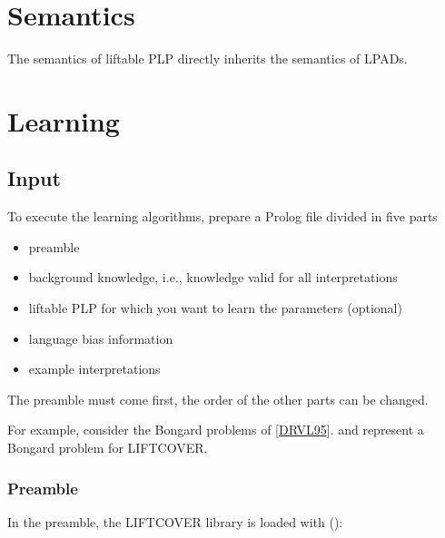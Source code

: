 \documentclass[letterpaper,10pt,english]{sphinxmanual}
\begin{document}
\chapter{Semantics}
\label{\detokenize{index:semantics}}
\sphinxAtStartPar
The semantics of liftable PLP directly inherits the semantics of LPADs.


\chapter{Learning}
\label{\detokenize{index:learning}}

\section{Input}
\label{\detokenize{index:input}}
\sphinxAtStartPar
To execute the learning algorithms, prepare a Prolog file divided in five parts
\begin{itemize}
\item {} 
\sphinxAtStartPar
preamble

\item {} 
\sphinxAtStartPar
background knowledge, i.e., knowledge valid for all interpretations

\item {} 
\sphinxAtStartPar
liftable PLP for which you want to learn the parameters (optional)

\item {} 
\sphinxAtStartPar
language bias information

\item {} 
\sphinxAtStartPar
example interpretations

\end{itemize}

\sphinxAtStartPar
The preamble must come first, the order of the other parts can be changed.

\sphinxAtStartPar
For example, consider the Bongard problems of {[}\hyperlink{cite.index:id22}{DRVL95}{]}.  and  represent a Bongard problem for LIFTCOVER.


\subsection{Preamble}
\label{\detokenize{index:preamble}}
\sphinxAtStartPar
In the preamble, the LIFTCOVER library is loaded with ():
\end{document}
